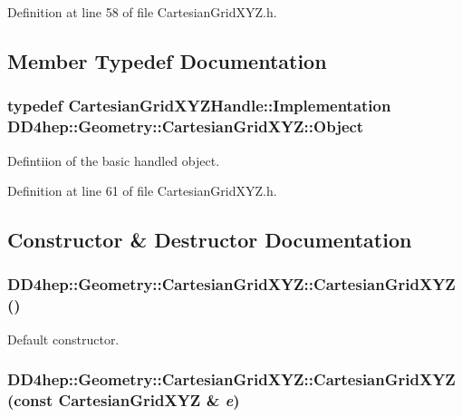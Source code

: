 Definition at line 58 of file CartesianGridXYZ.h.

\subsection{Member Typedef Documentation}
\hypertarget{class_d_d4hep_1_1_geometry_1_1_cartesian_grid_x_y_z_a14399d469a4ddf78e0df3e14276a3e4e}{
\subsubsection[{Object}]{\setlength{\rightskip}{0pt plus 5cm}typedef {\bf CartesianGridXYZHandle::Implementation} {\bf DD4hep::Geometry::CartesianGridXYZ::Object}}}
\label{class_d_d4hep_1_1_geometry_1_1_cartesian_grid_x_y_z_a14399d469a4ddf78e0df3e14276a3e4e}


Defintiion of the basic handled object. 

Definition at line 61 of file CartesianGridXYZ.h.

\subsection{Constructor \& Destructor Documentation}
\hypertarget{class_d_d4hep_1_1_geometry_1_1_cartesian_grid_x_y_z_a69b3b30ca60751b1278fc3a8defc0384}{
\subsubsection[{CartesianGridXYZ}]{\setlength{\rightskip}{0pt plus 5cm}DD4hep::Geometry::CartesianGridXYZ::CartesianGridXYZ ()}}
\label{class_d_d4hep_1_1_geometry_1_1_cartesian_grid_x_y_z_a69b3b30ca60751b1278fc3a8defc0384}


Default constructor. \hypertarget{class_d_d4hep_1_1_geometry_1_1_cartesian_grid_x_y_z_a1ee0b706bcec6bec756fe48f89bd8797}{
\subsubsection[{CartesianGridXYZ}]{\setlength{\rightskip}{0pt plus 5cm}DD4hep::Geometry::CartesianGridXYZ::CartesianGridXYZ (const {\bf CartesianGridXYZ} \& {\em e})}}
\label{class_d_d4hep_1_1_geometry_1_1_cartesian_grid_x_y_z_a1ee0b706bcec6bec756fe48f89bd8797}


